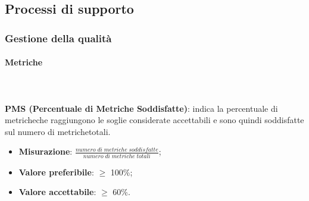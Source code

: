 											
			
	\subsection{Processi di supporto}		
		\subsubsection{Gestione della qualità}
			\paragraph{Metriche} \mbox{} \\ \\
				\textbf{PMS (Percentuale di Metriche Soddisfatte)}: indica la percentuale di metriche\glosp che raggiungono le soglie considerate accettabili e sono quindi soddisfatte sul numero di metriche\glosp totali.
				\begin{itemize}
					\item \textbf{Misurazione}: $\frac{numero \; di \; metriche \; soddisfatte}{numero \; di \; metriche \; totali}$;
					\item \textbf{Valore preferibile}: $\ge$ 100\%;
					\item \textbf{Valore accettabile}: $\ge$ 60\%.
				\end{itemize}


		  
			
				

